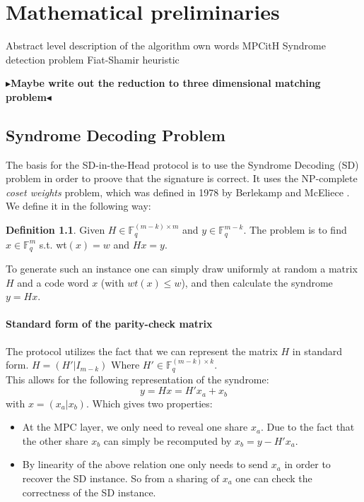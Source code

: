 \documentclass[twoside,11pt,openright]{report}
\theoremstyle{definition}
\newtheorem{definition}{Definition}[section]
\theoremstyle{plain}
\newcommand{\todo}[1]{{\color[rgb]{.5,0,0}\textbf{$\blacktriangleright$#1$\blacktriangleleft$}}}
\begin{document}
\chapter{Mathematical preliminaries}
\label{ch:desc}

Abstract level description of the algorithm own words
MPCitH
Syndrome detection problem
Fiat-Shamir heuristic

\todo{Maybe write out the reduction to three dimensional matching problem}
\section{Syndrome Decoding Problem}
\label{sec:syndrome}
The basis for the SD-in-the-Head protocol is to use the Syndrome Decoding (SD) problem in order to proove that the signature is correct.
It uses the NP-complete \textit{coset weights} problem, which was defined in 1978 by Berlekamp and McEliece \cite{berlekamp1978inherent}. 
We define it in the following way:
\begin{definition}
  \label{def:syndrome}
  Given $H \in \mathbb{F}^{(m-k)\times m}_q$ and $y \in \mathbb{F}^{m-k}_q$. The problem is to find $x \in \mathbb{F}^m_q$ s.t. wt$(x) = w$ and $Hx = y$.
\end{definition}

To generate such an instance one can simply draw uniformly at random a matrix $H$ and a code word $x$ (with $wt(x) \leq w$), and then calculate the syndrome $y = Hx$.

\subsubsection{Standard form of the parity-check matrix}\label{sec:standard_form_of_the_parity_check_matrix} 
The protocol utilizes the fact that we can represent the matrix $H$ in standard form. $H = (H'|I_{m-k}) $ Where $H' \in \mathbb{F}^{(m-k)\times k}_q$.
\\
This allows for the following representation of the syndrome:
\begin{equation}
  y = Hx = H'x_a + x_b
  \label{eq:standard_form_of_the_parity_check_matrix}
\end{equation}
with $x = (x_a | x_b)$.
Which gives two properties:
\begin{itemize}
  \item At the MPC layer, we only need to reveal one share $x_a$. Due to the fact that the other share $x_b$ can simply be recomputed by $x_b = y - H'x_a$.
  \item By linearity of the above relation one only needs to send $x_a$ in order to recover the SD instance. So from a sharing of $x_a$ one can check the correctness of the SD instance.
\end{itemize}
\end{document}
